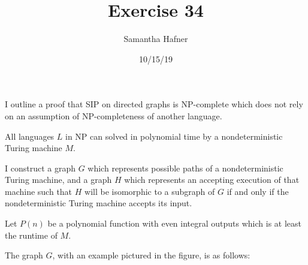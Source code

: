 \documentclass[12pt]{article}
\title{Exercise 34}
\author{Samantha Hafner}
\date{10/15/19}
\begin{document}
\maketitle


I outline a proof that SIP on directed graphs is NP-complete which does not rely on an assumption of NP-completeness of another language.

All languages $L$ in NP can solved in polynomial time by a nondeterministic Turing machine $M$.

I construct a graph $G$ which represents possible paths of a nondeterministic Turing machine, and a graph $H$ which represents an accepting execution of that machine such that $H$ will be isomorphic to a subgraph of $G$ if and only if the nondeterministic Turing machine accepts its input.

Let $P(n)$ be a polynomial function with even integral outputs which is at least the runtime of $M$.

\vspace{25px}

The graph $G$, with an example pictured in the figure, is as follows:
\end{document}
